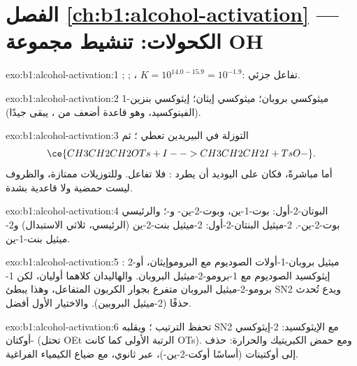 \section*{الفصل \ref{ch:b1:alcohol-activation} --- الكحولات: تنشيط مجموعة OH}

\begin{solution}{exo:b1:alcohol-activation:1}
;
;
، $K = 10^{14.0 - 15.9} = 10^{-1.9}$:
تفاعل جزئي.
\end{solution}

\begin{solution}{exo:b1:alcohol-activation:2}
1-ميثوكسي بروبان؛ ميثوكسي إيثان؛ إيثوكسي بنزين (الفينوكسيد، وهو قاعدة أضعف
من ، يبقى  جيدًا).
\end{solution}

\begin{solution}{exo:b1:alcohol-activation:3}
التوزلة في البيريدين تعطي ؛ ثم
\[ \ce{CH3CH2CH2OTs + I- -> CH3CH2CH2I + TsO-}. \] أما مباشرةً، فكان على اليوديد أن
يطرد : فلا تفاعل. وللتوزيلات  ممتازة،
والظروف ليست حمضية ولا قاعدية بشدة.
\end{solution}

\begin{solution}{exo:b1:alcohol-activation:4}
البوتان-2-أول: بوت-1-ين، وبوت-2-ين- و-؛ والرئيسي
بوت-2-ين-. 2-ميثيل البنتان-2-أول: 2-ميثيل بنت-2-ين (الرئيسي،
ثلاثي الاستبدال) و2-ميثيل بنت-1-ين.
\end{solution}

\begin{solution}{exo:b1:alcohol-activation:5}
: 2-ميثيل بروبان-1-أولات الصوديوم مع البروموإيثان،
أو إيثوكسيد الصوديوم مع 1-برومو-2-ميثيل البروبان. والهاليدان كلاهما أوليان،
لكن 1-برومو-2-ميثيل البروبان متفرع بجوار الكربون المتفاعل،
وهذا يبطئ SN2 ويدع  تُحدث حذفًا (2-ميثيل البروبين).
والاختيار الأول أفضل.
\end{solution}

\begin{solution}{exo:b1:alcohol-activation:6}
تحفظ  الترتيب ؛ ويقلبه SN2 مع الإيثوكسيد:
2-إيثوكسي أوكتان- (تحتل OEt الرتبة الأولى كما كانت OTs). ومع حمض الكبريتيك
والحرارة: حذف إلى أوكتينات (أساسًا أوكت-2-ين-)، عبر  ثانوي، مع ضياع الكيمياء الفراغية.
\end{solution}

